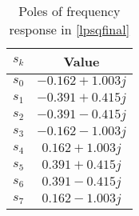 \begin{table}[!h]
    \centering
    \begin{tabular}{|c|c|}
    \hline
       $s_k$  &  \textbf{Value}\\
    \hline
       $s_0$  & $-0.162 + 1.003j$\\
    \hline
       $s_1$  & $-0.391 + 0.415j$\\
    \hline
       $s_2$  & $-0.391 - 0.415j$\\
    \hline
       $s_3$  & $-0.162 - 1.003j$\\
    \hline
       $s_4$  & $0.162 + 1.003j$\\
    \hline
       $s_5$  & $0.391 + 0.415j$\\
    \hline
       $s_6$  & $0.391 - 0.415j$\\
    \hline
       $s_7$  & $0.162 - 1.003j$\\
    \hline
    \end{tabular}
    \caption{Poles of frequency response in \eqref{lpsqfinal}}
    \label{tab:3}
\end{table}
